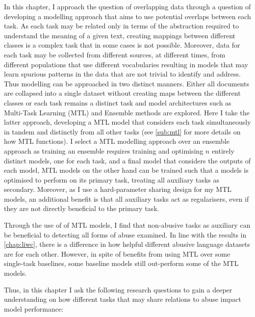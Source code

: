 In this chapter, I approach the question of overlapping data through a question of developing a modelling approach that aims to use potential overlaps between each task.
As each task may be related only in terms of the abstraction required to understand the meaning of a given text, creating mappings between different classes is a complex task that in some cases is not possible.
Moreover, data for each task may be collected from different sources, at different times, from different populations that use different vocabularies resulting in models that may learn spurious patterns in the data that are not trivial to identify and address.
Thus modelling can be approached in two distinct manners. Either all documents are collapsed into a single dataset without creating maps between the different classes or each task remains a distinct task and model architectures such as Multi-Task Learning (MTL) and Ensemble methods are explored.
Here I take the latter approach, developing a MTL model that considers each task simultaneously in tandem and distinctly from all other tasks (see \cref{sub:mtl} for more details on how MTL functions).
I select a MTL modelling approach over an ensemble approach as training an ensemble requires training and optimising $n$ entirely distinct models, one for each task, and a final model that considers the outputs of each model, MTL models on the other hand can be trained such that a models is optimised to perform on its primary task, treating all auxiliary tasks as secondary.
Moreover, as I use a hard-parameter sharing design for my MTL models, an additional benefit is that all auxiliary tasks act as regularisers, even if they are not directly beneficial to the primary task.

Through the use of of MTL models, I find that non-abusive tasks as auxiliary can be beneficial to detecting all forms of abuse examined.
In line with the results in \cref{chap:liwc}, there is a difference in how helpful different abusive language datasets are for each other. 
However, in spite of benefits from using MTL over some single-task baselines, some baseline models still out-perform some of the MTL models.


Thus, in this chapter I ask the following research questions to gain a deeper understanding on how different tasks that may share relations to abuse impact model performance:

